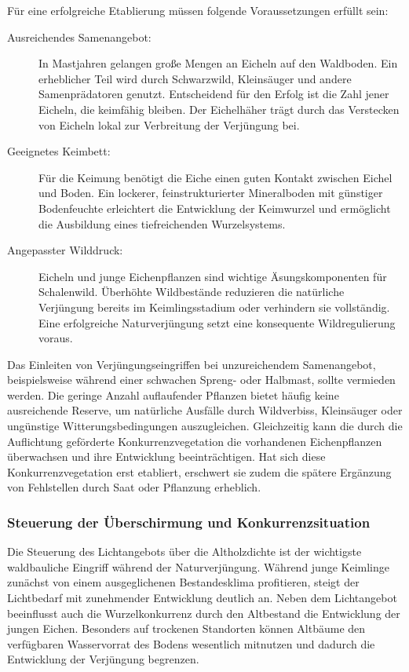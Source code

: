 \documentclass[twocolumn, bibliography=totoc, abstract=true]{scrartcl}
\begin{document}
Für eine erfolgreiche Etablierung müssen folgende Voraussetzungen erfüllt sein:
\begin{description}
\item[Ausreichendes Samenangebot:] In Mastjahren gelangen große Mengen an Eicheln auf den Waldboden. Ein erheblicher Teil wird durch Schwarzwild, Kleinsäuger und andere Samenprädatoren genutzt. Entscheidend für den Erfolg ist die Zahl jener Eicheln, die keimfähig bleiben. Der Eichelhäher trägt durch das Verstecken von Eicheln lokal zur Verbreitung der Verjüngung bei.
\item[Geeignetes Keimbett:] Für die Keimung benötigt die Eiche einen guten Kontakt zwischen Eichel und Boden. Ein lockerer, feinstrukturierter Mineralboden mit günstiger Bodenfeuchte erleichtert die Entwicklung der Keimwurzel und ermöglicht die Ausbildung eines tiefreichenden Wurzelsystems.
\item[Angepasster Wilddruck:] Eicheln und junge Eichenpflanzen sind wichtige Äsungskomponenten für Schalenwild. Überhöhte Wildbestände reduzieren die natürliche Verjüngung bereits im Keimlingsstadium oder verhindern sie vollständig. Eine erfolgreiche Naturverjüngung setzt eine konsequente Wildregulierung voraus.
\end{description}

Das Einleiten von Verjüngungseingriffen bei unzureichendem Samenangebot, beispielsweise während einer schwachen Spreng- oder Halbmast, sollte vermieden werden. Die geringe Anzahl auflaufender Pflanzen bietet häufig keine ausreichende Reserve, um natürliche Ausfälle durch Wildverbiss, Kleinsäuger oder ungünstige Witterungsbedingungen auszugleichen. Gleichzeitig kann die durch die Auflichtung geförderte Konkurrenzvegetation die vorhandenen Eichenpflanzen überwachsen und ihre Entwicklung beeinträchtigen. Hat sich diese Konkurrenzvegetation erst etabliert, erschwert sie zudem die spätere Ergänzung von Fehlstellen durch Saat oder Pflanzung erheblich.

\subsubsection{Steuerung der Überschirmung und Konkurrenzsituation}

Die Steuerung des Lichtangebots über die Altholzdichte ist der wichtigste waldbauliche Eingriff während der Naturverjüngung. Während junge Keimlinge zunächst von einem ausgeglichenen Bestandesklima profitieren, steigt der Lichtbedarf mit zunehmender Entwicklung deutlich an. Neben dem Lichtangebot beeinflusst auch die Wurzelkonkurrenz durch den Altbestand die Entwicklung der jungen Eichen. Besonders auf trockenen Standorten können Altbäume den verfügbaren Wasservorrat des Bodens wesentlich mitnutzen und dadurch die Entwicklung der Verjüngung begrenzen.
\end{document}
